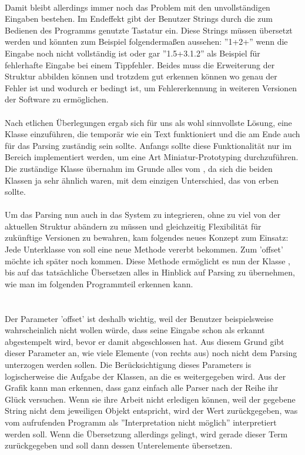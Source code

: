 \ \\
Damit bleibt allerdings immer noch das Problem mit den unvollständigen Eingaben bestehen. Im Endeffekt gibt der Benutzer Strings durch die zum Bedienen des Programms genutzte Tastatur ein. Diese Strings müssen übersetzt werden und könnten zum Beispiel folgendermaßen aussehen: ''1+2+'' wenn die Eingabe noch nicht vollständig ist oder gar ''1.5+3.1.2'' als Beispiel für fehlerhafte Eingabe bei einem Tippfehler. Beides muss die Erweiterung der Struktur abbilden können und trotzdem gut erkennen können wo genau der Fehler ist und wodurch er bedingt ist, um Fehlererkennung in weiteren Versionen der Software zu ermöglichen.\\
\\
Nach etlichen Überlegungen ergab sich für uns als wohl sinnvollste Lösung, eine Klasse einzuführen, die temporär wie ein Text funktioniert und die am Ende auch für das Parsing zuständig sein sollte. Anfangs sollte diese Funktionalität nur im Bereich  implementiert werden, um eine Art Miniatur-Prototyping durchzuführen. Die zuständige Klasse  übernahm im Grunde alles vom , da sich die beiden Klassen ja sehr ähnlich waren, mit dem einzigen Unterschied, das  von  erben sollte.\\
\\
Um das Parsing nun auch in das System zu integrieren, ohne zu viel von der aktuellen Struktur abändern zu müssen und gleichzeitig Flexibilität für zukünftige Versionen zu bewahren, kam folgendes neues Konzept zum Einsatz: Jede Unterklasse von  soll eine neue Methode  vererbt bekommen. Zum 'offset' möchte ich später noch kommen. Diese Methode ermöglicht es nun der Klasse , bis auf das tatsächliche Übersetzen alles in Hinblick auf Parsing zu übernehmen, wie man im folgenden Programmteil erkennen kann.\\
\\
\ \\
Der Parameter 'offset' ist deshalb wichtig, weil der Benutzer beispielsweise wahrscheinlich nicht wollen würde, dass seine Eingabe schon als erkannt abgestempelt wird, bevor er damit abgeschlossen hat. Aus diesem Grund gibt dieser Parameter an, wie viele Elemente (von rechts aus) noch nicht dem Parsing unterzogen werden sollen. Die Berücksichtigung dieses Parameters is logischerweise die Aufgabe der Klassen, an die es weitergegeben wird. Aus der Grafik kann man erkennen, dass ganz einfach alle Parser nach der Reihe ihr Glück versuchen. Wenn sie ihre Arbeit nicht erledigen können, weil der gegebene String nicht dem jeweiligen Objekt entspricht, wird der Wert  zurückgegeben, was vom aufrufenden Programm als ''Interpretation nicht möglich'' interpretiert werden soll. Wenn die Übersetzung allerdings gelingt, wird gerade dieser Term zurückgegeben und soll dann dessen Unterelemente übersetzen.\\

